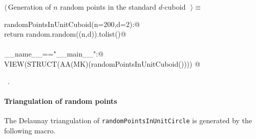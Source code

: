 \documentclass[11pt,oneside]{article}	%
\begin{document}
\begin{flushleft} \small \label{scrap24}
$\langle\,$Generation of $n$ random points in the standard $d$-cuboid\nobreak\ {\footnotesize {}}$\,\rangle\equiv$
\vspace{-1ex}
\begin{list}{}{} \item
\mbox{}\verb@def randomPointsInUnitCuboid(n=200,d=2):@\\
\mbox{}\verb@   return random.random((n,d)).tolist()@\\
\mbox{}\verb@@\\
\mbox{}\verb@if __name__=="__main__":@\\
\mbox{}\verb@   VIEW(STRUCT(AA(MK)(randomPointsInUnitCuboid()))) @\\
\mbox{}\verb@@{\NWsep}
\end{list}
\vspace{-1ex}
\footnotesize\addtolength{\baselineskip}{-1ex}
\begin{list}{}{\setlength{\itemsep}{-\parsep}\setlength{\itemindent}{-\leftmargin}}
\item \NWtxtMacroRefIn\ .
\end{list}
\end{flushleft}



\paragraph{Triangulation of random points} The Delaunay triangulation of \texttt{randomPointsInUnitCircle} is generated by the following macro.
\end{document}
